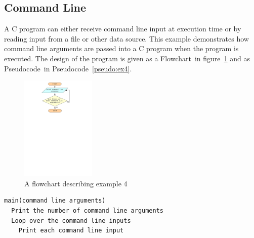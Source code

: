 \documentclass[11pt]{scrartcl}
\def\psc{Pseudocode}
\def\flo{Flowchart}
\begin{document}
\subsection{Command Line}
A C program can either receive command line input at execution time or
by reading input from a file or other data source.  This example
demonstrates how command line arguments are passed into a C program
when the program is executed.  The design of the program is given as a
\flo\ in figure~\ref{figure:flowchart_ex4} and as \psc\ in
\psc~\ref{pseudo:ex4}. 

\begin{figure}[h]
\begin{center}
\includegraphics[height=5cm]{figures/ex4}
\caption{A flowchart describing example 4
\label{figure:flowchart_ex4}}
\end{center}
\end{figure}

\begin{pseudocode}[h]
\begin{verbatim}
main(command line arguments)
  Print the number of command line arguments
  Loop over the command line inputs
    Print each command line input
\end{verbatim}
\caption{Example 4 in pseudocode \label{pseudo:ex4}}
\end{pseudocode}
\end{document}
